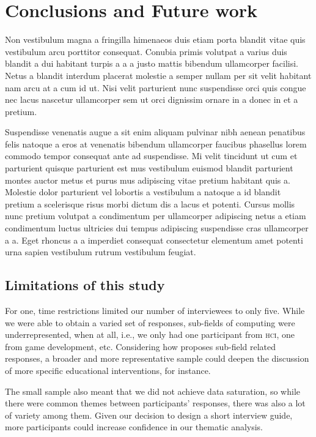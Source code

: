 
\section{Conclusions and Future work}

Non vestibulum magna a fringilla himenaeos duis etiam porta blandit vitae quis vestibulum arcu porttitor consequat. Conubia primis volutpat a varius duis blandit a dui habitant turpis a a a justo mattis bibendum ullamcorper facilisi. Netus a blandit interdum placerat molestie a semper nullam per sit velit habitant nam arcu at a cum id ut. Nisi velit parturient nunc suspendisse orci quis congue nec lacus nascetur ullamcorper sem ut orci dignissim ornare in a donec in et a pretium. 

Suspendisse venenatis augue a sit enim aliquam pulvinar nibh aenean penatibus felis natoque a eros at venenatis bibendum ullamcorper faucibus phasellus lorem commodo tempor consequat ante ad suspendisse. Mi velit tincidunt ut cum et parturient quisque parturient est mus vestibulum euismod blandit parturient montes auctor metus et purus mus adipiscing vitae pretium habitant quis a. Molestie dolor parturient vel lobortis a vestibulum a natoque a id blandit pretium a scelerisque risus morbi dictum dis a lacus et potenti. Cursus mollis nunc pretium volutpat a condimentum per ullamcorper adipiscing netus a etiam condimentum luctus ultricies dui tempus adipiscing suspendisse cras ullamcorper a a. Eget rhoncus a a imperdiet consequat consectetur elementum amet potenti urna sapien vestibulum rutrum vestibulum feugiat.


\subsection{Limitations of this study}
For one, time restrictions limited our number of interviewees to only five. While we were able to obtain a varied set of responses, sub-fields of computing were underrepresented, when at all, i.e., we only had one participant from \textsc{hci}, one from game development, etc. Considering how \cite{easterbrook2010climate} proposes sub-field related responses, a broader and more representative sample could deepen the discussion of more specific educational interventions, for instance.

The small sample also meant that we did not achieve data saturation, so while there were common themes between participants' responses, there was also a lot of variety among them. Given our decision to design a short interview guide, more participants could increase confidence in our thematic analysis.

